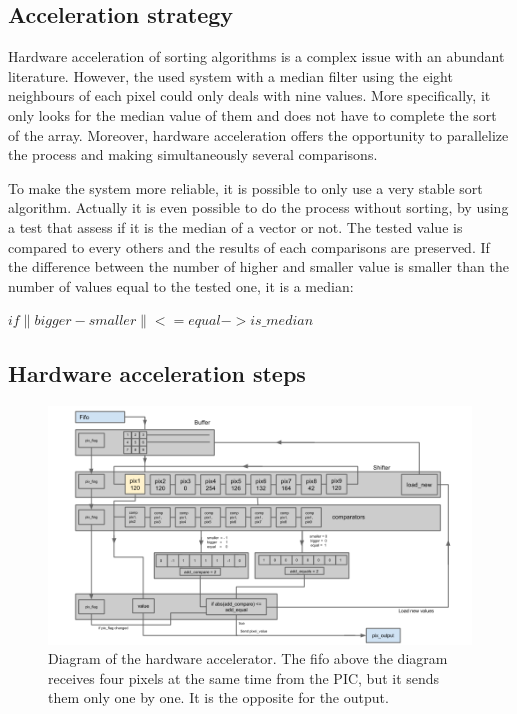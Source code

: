 \documentclass[journal]{IEEEtran}
\begin{document}
\subsection{Acceleration strategy}

Hardware acceleration of sorting algorithms is a complex issue with an abundant literature. However, the used system with a median filter using the eight neighbours of each pixel  could only deals with nine values. More specifically, it only looks for the median value of them and does not have to complete the sort of the array. Moreover, hardware acceleration offers the opportunity to parallelize the process and making simultaneously several comparisons.

To make the system more reliable, it is possible to only use a very stable sort algorithm. Actually it is even possible to do the process without sorting, by using a test that assess if it is the median of a vector or not. The tested value is compared to every others and the results of each comparisons are preserved. If the difference between the number of higher and smaller value is smaller than the number of values equal to the tested one, it is a median: 

\begin{math}
if \|bigger - smaller\| <= equal -> is\_median
\end{math}

\subsection{Hardware acceleration steps}

\begin{figure}
  \includegraphics[width=\textwidth]{slide_sc.png}
  \caption{Diagram of the hardware accelerator. The fifo above the diagram receives four pixels at the same time from the PIC, but it sends them only one by one. It is the opposite for the output.}
\end{figure}
\end{document}
